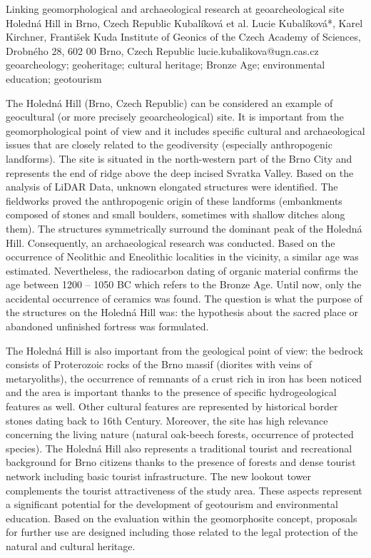 \abstract
{Linking geomorphological and archaeological research at geoarcheological site Holedná Hill in Brno, Czech Republic} 
{Kubalíková et al.} 
{Lucie Kubalíková*, Karel Kirchner, František Kuda} 
{\POtag} 
{Institute of Geonics of the Czech Academy of Sciences, Drobného 28, 602 00 Brno, Czech Republic
}
{lucie.kubalikova@ugn.cas.cz}  %
{geoarcheology; geoheritage; cultural heritage; Bronze Age; environmental education; geotourism}
{The Holedná Hill (Brno, Czech Republic) can be considered an example of geocultural (or more precisely geoarcheological) site. It is important from the geomorphological point of view and it includes specific cultural and archaeological issues that are closely related to the geodiversity (especially anthropogenic landforms). The site is situated in the north-western part of the Brno City and represents the end of ridge above the deep incised Svratka Valley. Based on the analysis of LiDAR Data, unknown elongated structures were identified. The fieldworks proved the anthropogenic origin of these landforms (embankments composed of stones and small boulders, sometimes with shallow ditches along them). The structures symmetrically surround the dominant peak of the Holedná Hill. Consequently, an archaeological research was conducted. Based on the occurrence of Neolithic and Eneolithic localities in the vicinity, a similar age was estimated. Nevertheless, the radiocarbon dating of organic material confirms the age between 1200 -- 1050 BC which refers to the Bronze Age. Until now, only the accidental occurrence of ceramics was found. The question is what the purpose of the structures on the Holedná Hill was: the hypothesis about the sacred place or abandoned unfinished fortress was formulated.

The Holedná Hill is also important from the geological point of view: the bedrock consists of Proterozoic rocks of the Brno massif (diorites with veins of metaryoliths), the occurrence of remnants of a crust rich in iron has been noticed and the area is important thanks to the presence of specific hydrogeological features as well. Other cultural features are represented by historical border stones dating back to 16th Century. Moreover, the site has high relevance concerning the living nature (natural oak-beech forests, occurrence of protected species). The Holedná Hill also represents a traditional tourist and recreational background for Brno citizens thanks to the presence of forests and dense tourist network including basic tourist infrastructure. The new lookout tower complements the tourist attractiveness of the study area. These aspects represent a significant potential for the development of geotourism and environmental education. Based on the evaluation within the geomorphosite concept, proposals for further use are designed including those related to the legal protection of the natural and cultural heritage.
}
